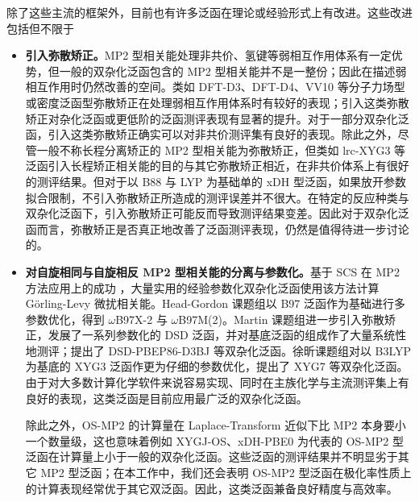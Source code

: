 除了这些主流的框架外，目前也有许多泛函在理论或经验形式上有改进。这些改进包括但不限于
\begin{itemize}[nosep]
  \item \textbf{引入弥散矫正。}MP2 型相关能处理非共价、氢键等弱相互作用体系有一定优势，但一般的双杂化泛函包含的 MP2 型相关能并不是一整份；因此在描述弱相互作用时仍然改善的空间。类如 DFT-D3\cite{Grimme-Goerigk.JCC.2011, Smith-Sherrill.JPCL.2016}、DFT-D4\cite{Caldeweyher-Grimme.JCP.2019}、VV10\cite{Vydrov-VanVoorhis.JCP.2010} 等分子力场型或密度泛函型弥散矫正在处理弱相互作用体系时有较好的表现；引入这类弥散矫正对杂化泛函或更低阶的泛函测评表现有显著的提升\cite{Goerigk-Grimme.PCCP.2017}。对于一部分双杂化泛函，引入这类弥散矫正确实可以对非共价测评集有良好的表现\cite{Grimme-Goerigk.JCC.2011, Santra-Martin.JPCA.2019}。除此之外，尽管一般不称长程分离矫正的 MP2 型相关能为弥散矫正，但类如 lrc-XYG3 等泛函引入长程矫正相关能的目的与其它弥散矫正相近，在非共价体系上有很好的测评结果\cite{Zhang-Xu.JPCL.2013}。但对于以 B88 与 LYP 为基础单的 xDH 型泛函，如果放开参数拟合限制，不引入弥散矫正所造成的测评误差并不很大\cite{Zhang-Xu.JPCL.2021, Santra-Martin.JPCL.2021}。在特定的反应种类与双杂化泛函下，引入弥散矫正可能反而导致测评结果变差\cite{Bremond-Adamo.JCP.2022}。因此对于双杂化泛函而言，弥散矫正是否真正地改善了泛函测评表现，仍然是值得待进一步讨论的。
  
  \item \textbf{对自旋相同与自旋相反 MP2 型相关能的分离与参数化。}基于 SCS 在 MP2 方法应用上的成功 \cite{Grimme-Grimme.JCP.2003}，大量实用的经验参数化双杂化泛函使用该方法计算 G\"{o}rling-Levy 微扰相关能。Head-Gordon 课题组以 B97 泛函作为基础进行多参数优化，得到 $\omega$B97X-2\cite{Chai-Head-Gordon.JCP.2009} 与 $\omega$B97M(2)\cite{Mardirossian-Head-Gordon.JCP.2018}。Martin 课题组进一步引入弥散矫正，发展了一系列参数化的 DSD 泛函，并对基底泛函的组成作了大量系统性地测评；提出了 DSD-PBEP86-D3BJ\cite{Kozuch-Martin.JCC.2013} 等双杂化泛函。徐昕课题组对以 B3LYP 为基底的 XYG3 泛函作更为仔细的参数优化，提出了 XYG7\cite{Zhang-Xu.JPCL.2021} 等双杂化泛函。由于对大多数计算化学软件来说容易实现、同时在主族化学与主流测评集上有良好的表现，这类泛函是目前应用最广泛的双杂化泛函。
  
  除此之外，OS-MP2 的计算量在 Laplace-Transform 近似下比 MP2 本身要小一个数量级\cite{Almloef-Almloef.CPL.1991}，这也意味着例如 XYGJ-OS\cite{Zhang-Goddard.PNAS.2011}、xDH-PBE0\cite{Zhang-Xu.JCP.2012} 为代表的 OS-MP2 型泛函在计算量上小于一般的双杂化泛函。这些泛函的测评结果并不明显劣于其它 MP2 型泛函；在本工作中，我们还会表明 OS-MP2 型泛函在极化率性质上的计算表现经常优于其它双泛函。因此，这类泛函兼备良好精度与高效率。
  

\end{itemize}
